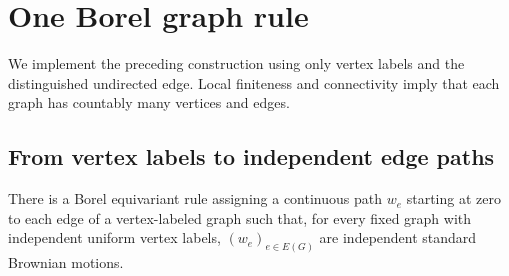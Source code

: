 \section{One Borel graph rule}
\label{sec:implementation}

We implement the preceding construction using only vertex labels and the
distinguished undirected edge. Local finiteness and connectivity imply that
each graph has countably many vertices and edges.

\subsection{From vertex labels to independent edge paths}

\begin{lemma}\label{lem:edge-noise}
There is a Borel equivariant rule assigning a continuous path $w_e$ starting
at zero to each edge of a vertex-labeled graph such that, for every fixed
graph with independent uniform vertex labels, $(w_e)_{e\in E(G)}$ are
independent standard Brownian motions.
\end{lemma}

